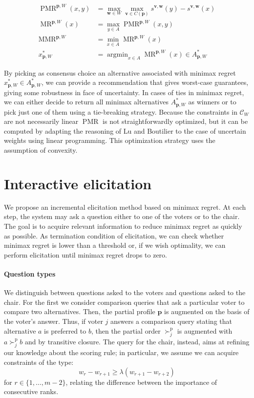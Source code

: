 \documentclass[a4paper,twoside]{article}
\newcommand{\ppref}{\succ^\text{p}}%
\newcommand{\profile}{\bm{v}}%
\newcommand{\pprofile}{{\bm{p}}}%
\newcommand{\w}{\bm{w}}
\newcommand{\Co}{\mathcal{C}}
\DeclareMathOperator{\Regret}{Regret}
\DeclareMathOperator{\PMR}{PMR}
\DeclareMathOperator{\MR}{MR}
\DeclareMathOperator{\MMR}{MMR}
\DeclareMathOperator*{\argmin}{argmin}
\begin{document}
\begin{align}
\PMR^{\pprofile,W}(x,y) & = \max_{\w \in W} \max_{\profile \in C(\pprofile)}s^{\profile,\w}(y) - s^{\profile, \w}(x) \\
\MR^{\pprofile,W}(x) & = \max_{y \in A} \PMR^{\pprofile,W}(x,y)\\
\MMR^{\pprofile,W} & = \min_{x \in A} \MR^{\pprofile,W}(x) \\
x^{*}_{\pprofile,W} & = \argmin_{x \in A}\MR^{\pprofile,W}(x) \in A^*_{\pprofile, W}
\end{align}

By picking as consensus choice an alternative associated with minimax regret $x^*_{\pprofile, W} \in A^*_{\pprofile, W} $, we can provide a recommendation that gives worst-case guarantees, giving some robustness in face of uncertainty. 
In cases of ties in minimax regret, we can either decide to return all minimax alternatives $A^*_{\pprofile, W}$ as winners or to pick just one of them using a tie-breaking strategy.
Because the constraints in $\Co_W$ are not necessarily linear $\PMR$ is not straightforwardly optimized, but it can be computed by adapting the reasoning of Lu and Boutilier \cite{Lu2011} to the case of uncertain weights using linear programming. This optimization strategy uses the assumption of convexity.

\section{Interactive elicitation} 
\label{sec:elicit}
We propose an incremental elicitation method based on minimax regret.
At each step, the system may ask a question either to one of the voters or to the chair.
The goal is to acquire relevant information to reduce minimax regret as quickly as possible.
As termination condition of elicitation, we can check whether minimax regret is lower than a threshold or, if we wish optimality, we can perform elicitation until minimax regret drops to zero.

\paragraph{Question types}
We distinguish between questions asked to the voters and questions asked to the chair.
For the first we consider comparison queries that ask a particular voter to compare two alternatives. Then, the partial profile $\pprofile$ is augmented on the basis of the voter's answer. Thus, if voter $j$ answers a comparison query stating that alternative $a$ is preferred to $b$, then the partial order $\ppref_j$ is augmented with $a \ppref_j b$ and by transitive closure.
The query for the chair, instead, aims at refining our knowledge about the scoring rule; in particular, we assume we can acquire constraints of the type:
\[ w_{r} - w_{r+1} \geq \lambda (w_{r+1} - w_{r+2}) \] 
for $r \in \{1,\ldots,m-2\}$, relating the difference between the importance of consecutive ranks.
\end{document}
